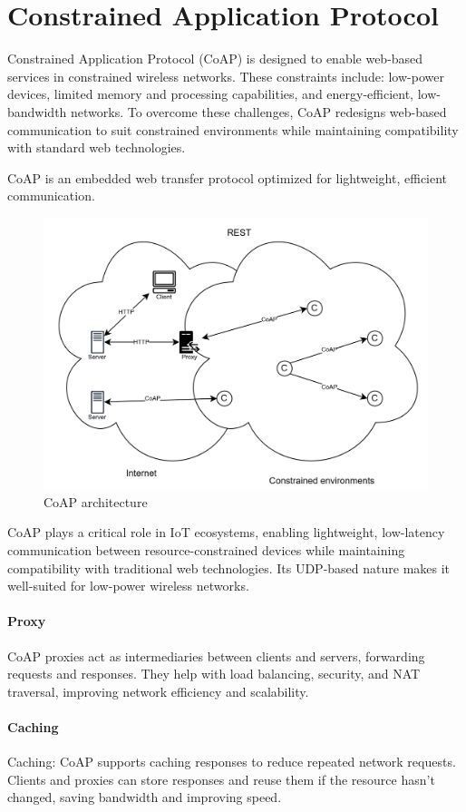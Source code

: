 \section{Constrained Application Protocol}

Constrained Application Protocol (CoAP) is designed to enable web-based services in constrained wireless networks. 
These constraints include: low-power devices, limited memory and processing capabilities, and energy-efficient, low-bandwidth networks. 
To overcome these challenges, CoAP redesigns web-based communication to suit constrained environments while maintaining compatibility with standard web technologies.

CoAP is an embedded web transfer protocol optimized for lightweight, efficient communication. 
\begin{figure}[H]
    \centering
    \includegraphics[width=0.75\linewidth]{images/iot9.png}
    \caption{CoAP architecture}
\end{figure}
\noindent CoAP plays a critical role in IoT ecosystems, enabling lightweight, low-latency communication between resource-constrained devices while maintaining compatibility with traditional web technologies. 
Its UDP-based nature makes it well-suited for low-power wireless networks.

\paragraph*{Proxy}
CoAP proxies act as intermediaries between clients and servers, forwarding requests and responses. 
They help with load balancing, security, and NAT traversal, improving network efficiency and scalability.

\paragraph*{Caching}
Caching: CoAP supports caching responses to reduce repeated network requests. 
Clients and proxies can store responses and reuse them if the resource hasn't changed, saving bandwidth and improving speed.

